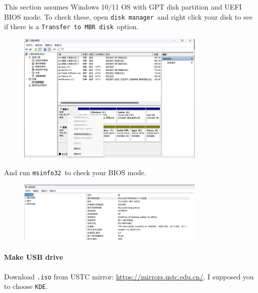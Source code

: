 \documentclass[12pt]{ctexart}
\newenvironment{mdquote}
{%
  \par\noindent
  \begin{list}{}{%
      \setlength{\leftmargin}{1em}%
      \setlength{\rightmargin}{0pt}%
      \setlength{\itemindent}{0pt}%
      \setlength{\listparindent}{\parindent}%
      \setlength{\topsep}{0.5\baselineskip}%
  }
  \item[\textbf{>}\ ]\itshape
}
{\end{list}\par}
\begin{document}
\begin{mdquote}
This section assumes Windows 10/11 OS with GPT disk partition and UEFI
BIOS mode. To check these, open \texttt{disk\ manager}\ and right click
your disk to see if there is a \texttt{Transfer\ to\ MBR\ disk}\ option.

\begin{figure}[H]
    \centering
    \includegraphics[width=0.8\textwidth,keepaspectratio]{assets/Linux/3.1 Seek common ground while reserving differences/2.png}
\end{figure}

And run \texttt{msinfo32}\ to check your BIOS mode.

\begin{figure}[H]
    \centering
    \includegraphics[width=0.8\textwidth,keepaspectratio]{assets/Linux/3.1 Seek common ground while reserving differences/3.png}
\end{figure}

\end{mdquote}

\paragraph{\textbf{Make USB drive}}\par
\vspace{1em}
Download \texttt{.iso} from USTC mirror:
\url{https://mirrors.ustc.edu.cn/}. I supposed you to choose
\texttt{KDE}.
\end{document}
